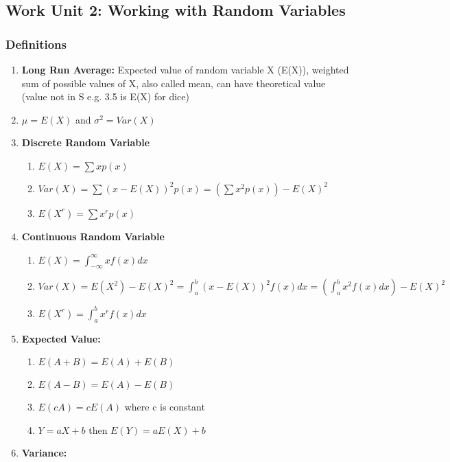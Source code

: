 \documentclass[a4paper,10pt]{article}
\begin{document}
\subsection{Work Unit 2: Working with Random Variables}
\subsubsection{Definitions}
\begin{enumerate}
	\item \textbf{Long Run Average:} Expected value of random variable X (E(X)), weighted sum of possible values of X, also called mean, can have theoretical value (value not in S e.g. 3.5 is E(X) for dice)
	\item $\mu= E(X)$ and $\sigma^2 = Var(X)$
	\item \textbf{Discrete Random Variable}
	\begin{enumerate}
		\item $E(X) = \sum xp(x)$
		\item $Var(X) = \sum (x-E(X))^2p(x) = (\sum x^2p(x))-E(X)^2$
		\item $E(X^r) = \sum x^rp(x)$
	\end{enumerate}
	\item \textbf{Continuous Random Variable}
	\begin{enumerate}
		\item $E(X) = \int_{-\infty}^{\infty} xf(x)dx$
		\item $Var(X) =E(X^2) - E(X)^2 =  \int_{a}^b (x-E(X))^2f(x)dx = (\int_a^b x^2f(x)dx)-E(X)^2$
		\item $E(X^r) = \int_a^b x^rf(x)dx$
	\end{enumerate}
	\item \textbf{Expected Value:}
	\begin{enumerate}
		\item $E(A+B) = E(A) + E(B)$
		\item $E(A-B) = E(A) - E(B)$
		\item $E(cA) = cE(A)$ where c is constant
		\item $Y = aX +b$ then $E(Y) = aE(X)+b$
	\end{enumerate}
	\item \textbf{Variance:}

\end{enumerate}
\end{document}
